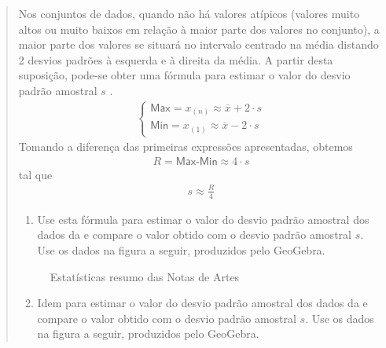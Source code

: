 \begin{quote}
Nos conjuntos de dados, quando não há valores atípicos (valores muito altos ou muito baixos em relação à maior parte dos valores no conjunto), a maior parte dos valores se situará no intervalo centrado na média distando 2 desvios padrões à esquerda e à direita da média. A partir desta suposição, pode-se obter uma fórmula para estimar o valor do desvio padrão amostral \(s\) .
\begin{equation*}
\begin{split}\left \{ \begin{array}{l} \textsf{Max}=x_{(n)}\approx \bar{x}+2\cdot s \\ \textsf{Min}=x_{(1)}\approx \bar{x}-2\cdot s\end{array}\right.\end{split}
\end{equation*}
Tomando a diferença das primeiras expressões apresentadas, obtemos
\begin{equation*}
\begin{split}R= \textsf{Max-Min} \approx 4\cdot s\end{split}
\end{equation*}
tal que
\begin{equation*}
\begin{split}s\approx \frac{R}{4}\end{split}
\end{equation*}\begin{enumerate}
\item {} 
Use esta fórmula para estimar o valor do desvio padrão amostral dos dados da  e compare o valor obtido com o desvio padrão amostral \(s\). Use os dados na figura a seguir, produzidos pelo GeoGebra.

\end{enumerate}

\begin{figure}[H]
\centering
\capstart

\noindent{}
\caption{Estatísticas resumo das Notas de Artes}\label{\detokenize{PE104-5:fig-resumonartes}}\label{\detokenize{PE104-5:id2}}\end{figure}
\begin{enumerate}
\setcounter{enumi}{1}
\item {} 
Idem para estimar o valor do desvio padrão amostral dos dados da  e compare o valor obtido com o desvio padrão amostral \(s\). Use os dados na figura a seguir, produzidos pelo GeoGebra.


\end{enumerate}
\end{quote}
